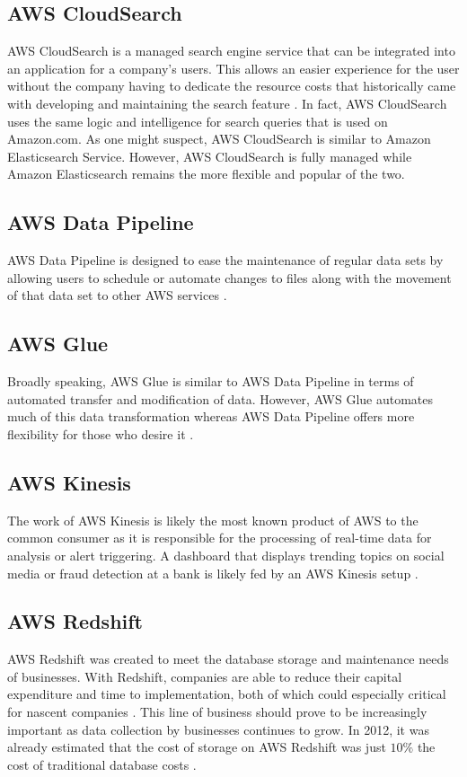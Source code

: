 \documentclass[sigconf]{acmart}
\begin{document}
\subsection{AWS CloudSearch}
AWS CloudSearch is a managed search engine service that can be integrated into an application for a company's users. This allows an easier experience for the user without the company having to dedicate the resource costs that historically came with developing and maintaining the search feature \cite{clouds}. In fact, AWS CloudSearch uses the same logic and intelligence for search queries that is used on Amazon.com. As one might suspect, AWS CloudSearch is similar to Amazon Elasticsearch Service. However, AWS CloudSearch is fully managed while Amazon Elasticsearch remains the more flexible and popular of the two.

\subsection{AWS Data Pipeline}
AWS Data Pipeline is designed to ease the maintenance of regular data sets by allowing users to schedule or automate changes to files along with the movement of that data set to other AWS services \cite{datapipe}. 
\subsection{AWS Glue}
Broadly speaking, AWS Glue is similar to AWS Data Pipeline in terms of automated transfer and modification of data. However, AWS Glue automates much of this data transformation whereas AWS Data Pipeline offers more flexibility for those who desire it \cite{glue}.
\subsection{AWS Kinesis}
The work of AWS Kinesis is likely the most known product of AWS to the common consumer as it is responsible for the processing of real-time data for analysis or alert triggering. A dashboard that displays trending topics on social media or fraud detection at a bank is likely fed by an AWS Kinesis setup \cite{kinesis}. 
\subsection{AWS Redshift}
AWS Redshift was created to meet the database storage and maintenance needs of businesses. With Redshift, companies are able to reduce their capital expenditure and time to implementation, both of which could especially critical for nascent companies \cite{redshift_1}. This line of business should prove to be increasingly important as data collection by businesses continues to grow. In 2012, it was already estimated that the cost of storage on AWS Redshift was just $10\%$ the cost of traditional database costs \cite{redshift_2}. 
\end{document}
